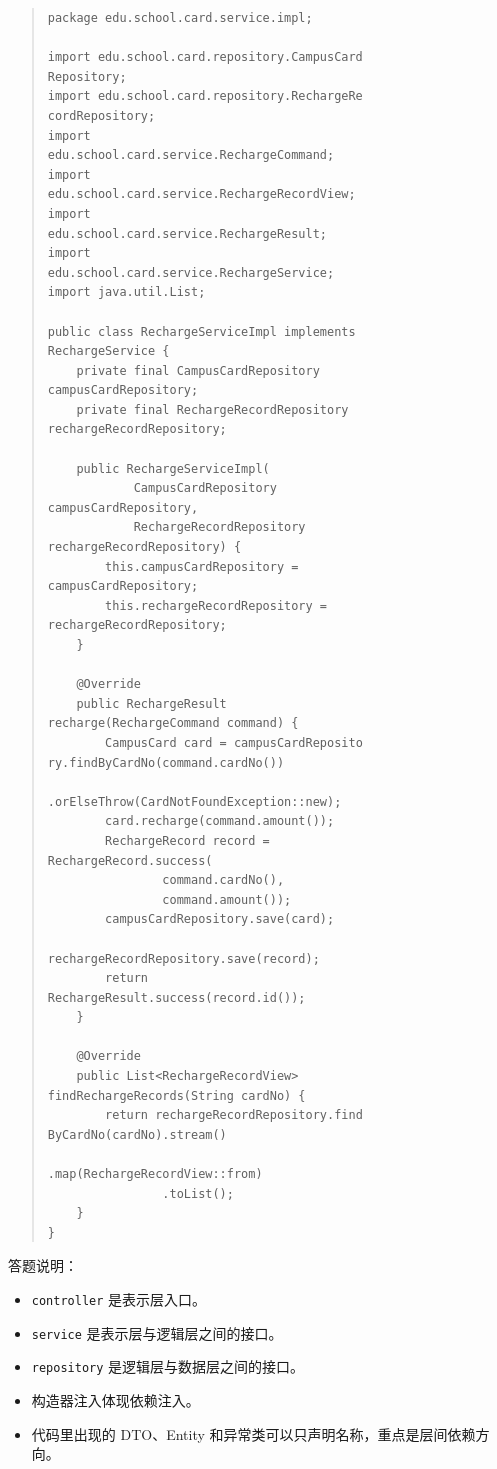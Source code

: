 \documentclass[UTF8,zihao=-4]{ctexart}
\begin{document}
\begin{quote}
\footnotesize
\begin{verbatim}
package edu.school.card.service.impl;

import edu.school.card.repository.CampusCard
Repository;
import edu.school.card.repository.RechargeRe
cordRepository;
import 
edu.school.card.service.RechargeCommand;
import 
edu.school.card.service.RechargeRecordView;
import 
edu.school.card.service.RechargeResult;
import 
edu.school.card.service.RechargeService;
import java.util.List;

public class RechargeServiceImpl implements 
RechargeService {
    private final CampusCardRepository 
campusCardRepository;
    private final RechargeRecordRepository 
rechargeRecordRepository;

    public RechargeServiceImpl(
            CampusCardRepository 
campusCardRepository,
            RechargeRecordRepository 
rechargeRecordRepository) {
        this.campusCardRepository = 
campusCardRepository;
        this.rechargeRecordRepository = 
rechargeRecordRepository;
    }

    @Override
    public RechargeResult 
recharge(RechargeCommand command) {
        CampusCard card = campusCardReposito
ry.findByCardNo(command.cardNo())
                
.orElseThrow(CardNotFoundException::new);
        card.recharge(command.amount());
        RechargeRecord record = 
RechargeRecord.success(
                command.cardNo(),
                command.amount());
        campusCardRepository.save(card);
        
rechargeRecordRepository.save(record);
        return 
RechargeResult.success(record.id());
    }

    @Override
    public List<RechargeRecordView> 
findRechargeRecords(String cardNo) {
        return rechargeRecordRepository.find
ByCardNo(cardNo).stream()
                
.map(RechargeRecordView::from)
                .toList();
    }
}
\end{verbatim}
\end{quote}

答题说明：

\begin{itemize}
\item \texttt{controller} 是表示层入口。
\item \texttt{service} 是表示层与逻辑层之间的接口。
\item \texttt{repository} 是逻辑层与数据层之间的接口。
\item 构造器注入体现依赖注入。
\item 代码里出现的 DTO、Entity 和异常类可以只声明名称，重点是层间依赖方向。
\end{itemize}
\end{document}
